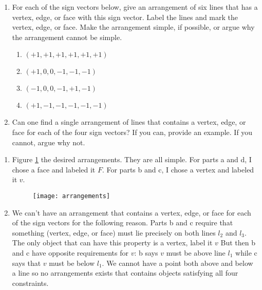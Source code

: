 \documentclass[11pt]{article}
\begin{document}
\begin{enumerate}

    \item For each of the sign vectors below, give an arrangement of six lines
        that has a vertex, edge, or face with this sign vector. Label the lines
        and mark the vertex, edge, or face. Make the arrangement simple, if
        possible, or argue why the arrangement cannot be simple.
        \begin{enumerate}
            \item $(+1, +1, +1, +1, +1, +1)$
            \item $(+1, 0, 0, -1, -1, -1)$
            \item $(-1, 0, 0, -1, +1, -1)$
            \item $(+1, -1, -1, -1, -1, -1)$
        \end{enumerate}

    \item Can one find a single arrangement of lines that contains a vertex,
        edge, or face for each of the four sign vectors? If you can, provide an
        example.  If you cannot, argue why not.

\end{enumerate}

\answer
\begin{enumerate}
	\item Figure \ref{fig:arrangments} the desired arrangements.
	They are all simple.
	For parts a and d, I chose a face and labeled it $F$.
	For parts b and c, I chose a vertex and labeled it $v$.

	\begin{figure}[h]
		\centering
		\texttt{[image: arrangements]}
		\label{fig:arrangments}
	\end{figure}

	\item We can't have an arrangement that contains a vertex, edge, or face for each of the sign vectors for the following reason.
	Parts b and c require that something (vertex, edge, or face) must lie precisely on both lines $l_2$ and $l_3$.
	The only object that can have this property is a vertex, label it $v$
	But then b and c have opposite requirements for $v$: b says $v$ must be above line $l_1$ while c says that $v$ must be below $l_1$.
	We cannot have a point both above and below a line so no arrangements exists that contains objects satisfying all four constraints.
\end{enumerate}
\end{document}
